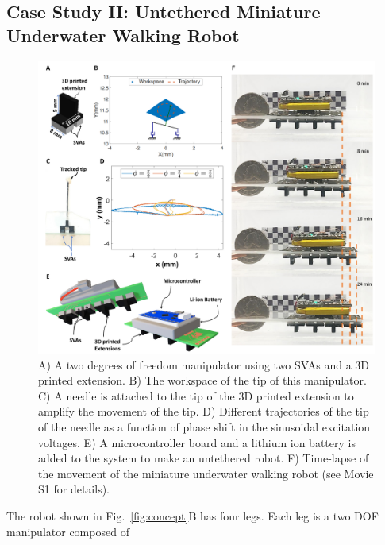\subsection{Case Study II: Untethered Miniature Underwater Walking Robot} 
\begin{figure}[!t]
      \centering
      \includegraphics[width=1\textwidth]{Fig3.pdf}
      \caption[Design and evaluation of untethered miniature underwater walking robot]{A) A two degrees of freedom manipulator using two SVAs and a 3D printed extension. B) The workspace of the tip of this manipulator. C) A needle is attached to the tip of the 3D printed extension to amplify the movement of the tip. D) Different trajectories of the tip of the needle as a function of phase shift in the sinusoidal excitation voltages. E) A microcontroller board and a lithium ion battery is added to the system to make an untethered robot. F) Time-lapse of the movement of the miniature underwater walking robot (see Movie S1 for details).}
      \label{fig:untethered_podia}
\end{figure}
The robot shown in Fig.~\ref{fig:concept}B has four legs. Each leg is a two DOF manipulator composed of 
